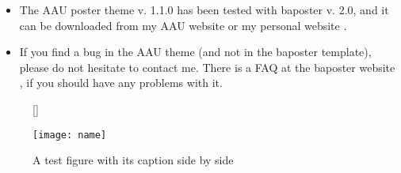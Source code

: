   \begin{itemize}
  	\item The AAU poster theme v. 1.1.0 has been tested with baposter v. 2.0, and it can be downloaded from my AAU website \cite{jknaau} or my personal website \cite{jknsqrt-1}.
  	\item If you find a bug in the AAU theme (and not in the baposter template), please do not hesitate to contact me. There is a FAQ at the baposter website \cite{baposter}, if you should have any problems with it.
  \end{itemize}
  
  
\begin{figure}
  	[\FBwidth]
  	{\caption{A test figure with its caption side by side}\label{fig:test}}
  	{\texttt{[image: name]}}
\end{figure}